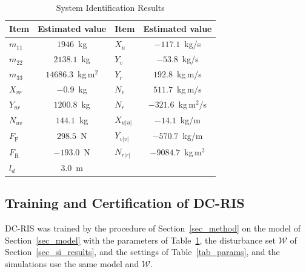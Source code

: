 \documentclass[lettersize,journal]{IEEEtran}
\newcommand{\calW}{\mathcal{W}}
\newcommand{\gR}{\mathrm{R}}
\newcommand{\gF}{\mathrm{F}}
\newcommand{\dcris}{DC-RIS\xspace}
\begin{document}
\begin{table}[!t]
\renewcommand{\arraystretch}{1.3}
\caption{System Identification Results}
\label{tab_si}
\centering
\footnotesize
\begin{tabular}{lclc}
\toprule
Item & Estimated value & Item & Estimated value \\
\midrule
$m_{11}$ & $1946$~kg & $X_u$ & $-117.1$~kg/s \\
$m_{22}$ & $2138.1$~kg & $Y_v$ & $-53.8$~kg/s \\
$m_{33}$ & $14686.3$~kg\,m$^2$ & $Y_r$ & $192.8$~kg\,m/s \\
$X_{vr}$ & $-0.9$~kg & $N_v$ & $511.7$~kg\,m/s \\
$Y_{ur}$ & $1200.8$~kg & $N_r$ & $-321.6$~kg\,m$^2$/s \\
$N_{uv}$ & $144.1$~kg & $X_{u|u|}$ & $-14.1$~kg/m \\
$F_{\gF}$ & $298.5$~N & $Y_{v|v|}$ & $-570.7$~kg/m \\
$F_{\gR}$ & $-193.0$~N & $N_{r|r|}$ & $-9084.7$~kg\,m$^2$ \\
$l_d$ & $3.0$~m &  &  \\
\bottomrule
\end{tabular}
\end{table}

\subsection{Training and Certification of \dcris}\label{sec_train}

\dcris was trained by the procedure of Section~\ref{sec_method} on the model of Section~\ref{sec_model} with the parameters of Table~\ref{tab_si}, the disturbance set $\calW$ of Section~\ref{sec_si_results}, and the settings of Table~\ref{tab_params}, and the simulations use the same model and $\calW$.
\end{document}
